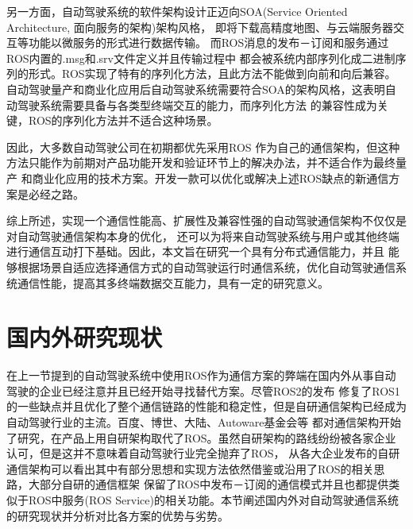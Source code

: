 另一方面，自动驾驶系统的软件架构设计正迈向SOA(Service Oriented Architecture, 面向服务的架构)架构风格，
即将下载高精度地图、与云端服务器交互等功能以微服务的形式进行数据传输。
而ROS消息的发布－订阅和服务通过ROS内置的.msg和.srv文件定义并且传输过程中
都会被系统内部序列化成二进制序列的形式。ROS实现了特有的序列化方法，且此方法不能做到向前和向后兼容。
自动驾驶量产和商业化应用后自动驾驶系统需要符合SOA的架构风格，这表明自动驾驶系统需要具备与各类型终端交互的能力，而序列化方法
的兼容性成为关键，ROS的序列化方法并不适合这种场景。

因此，大多数自动驾驶公司在初期都优先采用ROS
作为自己的通信架构，但这种方法只能作为前期对产品功能开发和验证环节上的解决办法，并不适合作为最终量产
和商业化应用的技术方案。开发一款可以优化或解决上述ROS缺点的新通信方案是必经之路\cite{xml}。

综上所述，实现一个通信性能高、扩展性及兼容性强的自动驾驶通信架构不仅仅是对自动驾驶通信架构本身的优化，
还可以为将来自动驾驶系统与用户或其他终端进行通信互动打下基础。因此，本文旨在研究一个具有分布式通信能力，并且
能够根据场景自适应选择通信方式的自动驾驶运行时通信系统，优化自动驾驶通信系统通信性能，提高其多终端数据交互能力，具有一定的研究意义。

\section{国内外研究现状}
在上一节提到的自动驾驶系统中使用ROS作为通信方案的弊端在国内外从事自动驾驶的企业已经注意并且已经开始寻找替代方案。尽管ROS2的发布
修复了ROS1的一些缺点并且优化了整个通信链路的性能和稳定性，但是自研通信架构已经成为自动驾驶行业的主流。百度、博世、大陆、Autoware基金会等
都对通信架构开始了研究，在产品上用自研架构取代了ROS。虽然自研架构的路线纷纷被各家企业认可，但是这并不意味着自动驾驶行业完全抛弃了ROS，
从各大企业发布的自研通信架构可以看出其中有部分思想和实现方法依然借鉴或沿用了ROS的相关思路，大部分自研的通信框架
保留了ROS中发布－订阅的通信模式并且也都提供类似于ROS中服务(ROS Service)的相关功能。本节阐述国内外对自动驾驶通信系统
的研究现状并分析对比各方案的优势与劣势。
